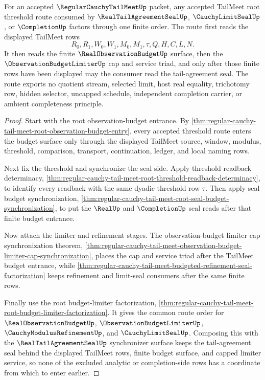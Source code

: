 \begin{theorem}
\label{thm:regular-cauchy-tail-meet-real-tail-agreement-factorization}
For an accepted $\RegularCauchyTailMeetUp$ packet, any accepted TailMeet root threshold route consumed by $\RealTailAgreementSealUp$, $\CauchyLimitSealUp$, or $\CompletionUp$ factors through one finite order. The route first reads the displayed TailMeet rows
$$
R_0,R_1,W_0,W_1,M_0,M_1,\tau,Q,H,C,L,N.
$$
It then reads the finite $\RealObservationBudgetUp$ surface, then the $\ObservationBudgetLimiterUp$ cap and service triad, and only after those finite rows have been displayed may the consumer read the tail-agreement seal. The route exports no quotient stream, selected limit, host real equality, trichotomy row, hidden selector, uncapped schedule, independent completion carrier, or ambient completeness principle.
\end{theorem}
\begin{proof}
Start with the root observation-budget entrance. By \autoref{thm:regular-cauchy-tail-meet-root-observation-budget-entry}, every accepted threshold route enters the budget surface only through the displayed TailMeet source, window, modulus, threshold, comparison, transport, continuation, ledger, and local naming rows.

Next fix the threshold and synchronize the seal side. Apply threshold readback determinacy, \autoref{thm:regular-cauchy-tail-meet-root-threshold-readback-determinacy}, to identify every readback with the same dyadic threshold row $\tau$. Then apply seal budget synchronization, \autoref{thm:regular-cauchy-tail-meet-root-seal-budget-synchronization}, to put the $\RealUp$ and $\CompletionUp$ seal reads after that finite budget entrance.

Now attach the limiter and refinement stages. The observation-budget limiter cap synchronization theorem, \autoref{thm:regular-cauchy-tail-meet-observation-budget-limiter-cap-synchronization}, places the cap and service triad after the TailMeet budget entrance, while \autoref{thm:regular-cauchy-tail-meet-budgeted-refinement-seal-factorization} keeps refinement and limit-seal consumers after the same finite rows.

Finally use the root budget-limiter factorization, \autoref{thm:regular-cauchy-tail-meet-root-budget-limiter-factorization}. It gives the common route order for $\RealObservationBudgetUp$, $\ObservationBudgetLimiterUp$, $\CauchyModulusRefinementUp$, and $\CauchyLimitSealUp$. Composing this with the $\RealTailAgreementSealUp$ synchronizer surface keeps the tail-agreement seal behind the displayed TailMeet rows, finite budget surface, and capped limiter service, so none of the excluded analytic or completion-side rows has a coordinate from which to enter earlier.
\end{proof}


